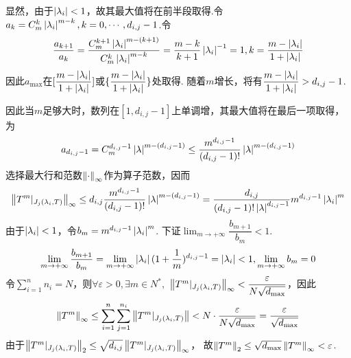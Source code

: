 显然，由于\(\left\lvert \lambda_i \right\rvert<1\)，故其最大值将在前半段取得.令\(a_k=C_m^k \left\lvert \lambda_i \right\rvert^{m-k},k=0,\cdots,d_{i,j}-1\).令
    \begin{align*}
        \dfrac{a_{k+1}}{a_k}=\dfrac{C_m^{k+1}\left\lvert \lambda_i \right\rvert^{m-(k+1)}}{C_m^k \left\lvert \lambda_i \right\rvert^{m-k}}=
        \dfrac{m-k}{k+1} \left\lvert \lambda_i \right\rvert^{-1}=1,k=\dfrac{m-\left\lvert \lambda_i \right\rvert}{1+\left\lvert \lambda_i \right\rvert}
    \end{align*}
因此\(a_{\max}\)在\([\dfrac{m-\left\lvert \lambda_i \right\rvert}{1+\left\lvert \lambda_i \right\rvert}]\)或\(\{\dfrac{m-\left\lvert \lambda_i \right\rvert}{1+\left\lvert \lambda_i \right\rvert}\}\)处取得.
随着\(m\)增长，将有\(\dfrac{m-\left\lvert \lambda_i \right\rvert}{1+\left\lvert \lambda_i \right\rvert}>d_{i,j}-1\).

因此当\(m\)足够大时，数列在\([1,d_{i,j}-1]\)上单调增，其最大值将在最后一项取得，为
    \begin{align*}
        a_{d_{i,j}-1}=C_m^{d_{i,j}-1}\left\lvert \lambda \right\rvert^{m-(d_{i,j}-1)} \leq 
        \dfrac{m^{d_{i,j}-1}}{(d_{i,j}-1)!}\left\lvert \lambda \right\rvert^{m-(d_{i,j}-1)}
    \end{align*}
选择最大行和范数\(\left\lVert \cdot \right\rVert_{\infty}\)作为算子范数，因而
    \begin{align*}
        \left\lVert T^m|_{J_j(\lambda_i,T)} \right\rVert_{\infty} \leq d_{i,j}\dfrac{m^{d_{i,j}-1}}{(d_{i,j}-1)!}\left\lvert \lambda \right\rvert^{m-(d_{i,j}-1)}
        =\dfrac{d_{i,j}}{(d_{i,j}-1)! \left\lvert \lambda \right\rvert^{d_{i,j}-1}}m^{d_{i,j}-1}\left\lvert \lambda_i \right\rvert^m
    \end{align*}
由于\(\left\lvert \lambda_i \right\rvert<1\)，令\(b_m=m^{d_{i,j}-1}\left\lvert \lambda_i \right\rvert^m\).
下证\(\lim_{m \rightarrow +\infty} \dfrac{b_{m+1}}{b_m}<1\).
    \begin{align*}
        \lim_{m \rightarrow +\infty} \dfrac{b_{m+1}}{b_m}
        =\lim_{m \rightarrow +\infty} \left\lvert \lambda_i \right\rvert(1+\dfrac{1}{m})^{d_{i,j}-1}=\left\lvert \lambda_i \right\rvert<1,
        \lim_{m \rightarrow +\infty} b_m=0
    \end{align*}
令\(\sum_{i=1}^n n_i=N\)，则\(\forall \varepsilon>0,\exists m \in N^*,\)
\(\left\lVert T^m|_{J_j(\lambda_i,T)} \right\rVert_{\infty}<\dfrac{\varepsilon}{N \sqrt{d_{\max}}}\)，因此
    \begin{align*}
        \left\lVert T^m \right\rVert_{\infty} \leq \sum_{i=1}^n \sum_{j=1}^{n_i}\left\lVert T^m|_{J_j(\lambda_i,T)} \right\rVert<
        N \cdot \dfrac{\varepsilon}{N \sqrt{d_{\max}}}=\dfrac{\varepsilon}{\sqrt{d_{\max}}}
    \end{align*}
由于\(\left\lVert T^m|_{J_j(\lambda_i,T)} \right\rVert_2 \leq \sqrt{d_{i,j}}\left\lVert T^m|_{J_j(\lambda_i,T)} \right\rVert_{\infty}\)，
故\(\left\lVert T^m \right\rVert_2 \leq \sqrt{d_{\max}}\left\lVert T^m \right\rVert_{\infty}<\varepsilon\).

